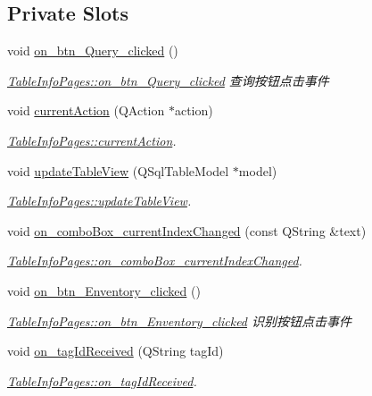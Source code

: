 \subsection*{Private Slots}
\begin{DoxyCompactItemize}
\item 
void \mbox{\hyperlink{class_table_info_pages_a22d86b2a8cb70049164f3d880f9f237a}{on\+\_\+btn\+\_\+\+Query\+\_\+clicked}} ()
\begin{DoxyCompactList}\small\item\em \mbox{\hyperlink{class_table_info_pages_a22d86b2a8cb70049164f3d880f9f237a}{Table\+Info\+Pages\+::on\+\_\+btn\+\_\+\+Query\+\_\+clicked}} 查询按钮点击事件 \end{DoxyCompactList}\item 
void \mbox{\hyperlink{class_table_info_pages_ad1da457e9ca5163f17d14035185457f7}{current\+Action}} (Q\+Action $\ast$action)
\begin{DoxyCompactList}\small\item\em \mbox{\hyperlink{class_table_info_pages_ad1da457e9ca5163f17d14035185457f7}{Table\+Info\+Pages\+::current\+Action}}. \end{DoxyCompactList}\item 
void \mbox{\hyperlink{class_table_info_pages_a36dc73fa99cf8cfb6139ff33a1cd9741}{update\+Table\+View}} (Q\+Sql\+Table\+Model $\ast$model)
\begin{DoxyCompactList}\small\item\em \mbox{\hyperlink{class_table_info_pages_a36dc73fa99cf8cfb6139ff33a1cd9741}{Table\+Info\+Pages\+::update\+Table\+View}}. \end{DoxyCompactList}\item 
void \mbox{\hyperlink{class_table_info_pages_aaa08abbcf7a0c7c76645896a9cdb610e}{on\+\_\+combo\+Box\+\_\+current\+Index\+Changed}} (const Q\+String \&text)
\begin{DoxyCompactList}\small\item\em \mbox{\hyperlink{class_table_info_pages_aaa08abbcf7a0c7c76645896a9cdb610e}{Table\+Info\+Pages\+::on\+\_\+combo\+Box\+\_\+current\+Index\+Changed}}. \end{DoxyCompactList}\item 
void \mbox{\hyperlink{class_table_info_pages_aa65b69a9006eed0d90854eae510f2246}{on\+\_\+btn\+\_\+\+Enventory\+\_\+clicked}} ()
\begin{DoxyCompactList}\small\item\em \mbox{\hyperlink{class_table_info_pages_aa65b69a9006eed0d90854eae510f2246}{Table\+Info\+Pages\+::on\+\_\+btn\+\_\+\+Enventory\+\_\+clicked}} 识别按钮点击事件 \end{DoxyCompactList}\item 
void \mbox{\hyperlink{class_table_info_pages_aaa0d74e1218669ec7b10609c82b130d9}{on\+\_\+tag\+Id\+Received}} (Q\+String tag\+Id)
\begin{DoxyCompactList}\small\item\em \mbox{\hyperlink{class_table_info_pages_aaa0d74e1218669ec7b10609c82b130d9}{Table\+Info\+Pages\+::on\+\_\+tag\+Id\+Received}}. \end{DoxyCompactList}\end{DoxyCompactItemize}
